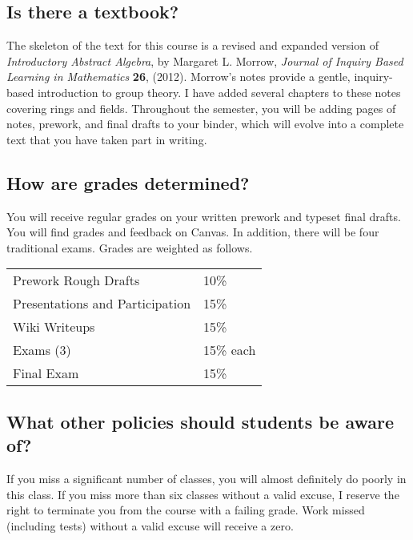 \documentclass[
  twoside]{article}
\begin{document}
\hypertarget{is-there-a-textbook}{%
\subsection{Is there a textbook?}\label{is-there-a-textbook}}

The skeleton of the text for this course is a revised and expanded
version of \textit{Introductory Abstract Algebra}, by Margaret L.
Morrow, \textit{Journal of Inquiry Based Learning in Mathematics}
\textbf{26}, (2012). Morrow's notes provide a gentle, inquiry-based
introduction to group theory. I have added several chapters to these
notes covering rings and fields. Throughout the semester, you will be
adding pages of notes, prework, and final drafts to your binder, which
will evolve into a complete text that you have taken part in writing.

\hypertarget{how-are-grades-determined}{%
\subsection{How are grades
determined?}\label{how-are-grades-determined}}

You will receive regular grades on your written prework and typeset
final drafts. You will find grades and feedback on Canvas. In addition,
there will be four traditional exams. Grades are weighted as follows.

\begin{tabular}[t]{ll}
\toprule
Prework Rough Drafts & 10\%\\
Presentations and Participation & 15\%\\
Wiki Writeups & 15\%\\
Exams (3) & 15\% each\\
Final Exam & 15\%\\
\bottomrule
\end{tabular}

\hypertarget{what-other-policies-should-students-be-aware-of}{%
\subsection{What other policies should students be aware
of?}\label{what-other-policies-should-students-be-aware-of}}

If you miss a significant number of classes, you will almost definitely
do poorly in this class. If you miss more than six classes without a
valid excuse, I reserve the right to terminate you from the course with
a failing grade. Work missed (including tests) without a valid excuse
will receive a zero.
\end{document}
